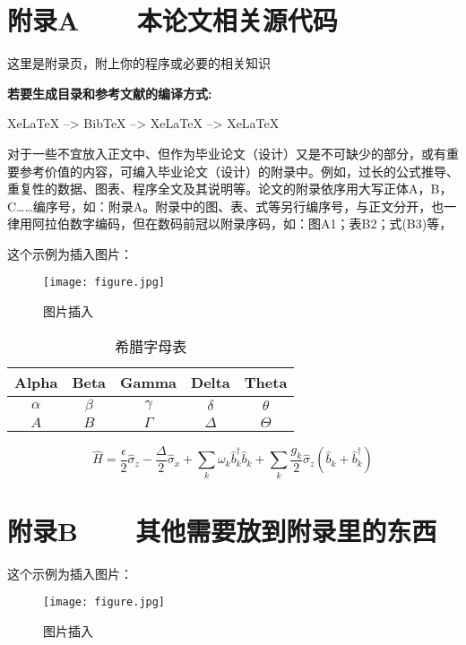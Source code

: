 \chapter*{附录A~~~~本论文相关源代码}
这里是附录页，附上你的程序或必要的相关知识

\bf\heiti\color{red}若要生成目录和参考文献的编译方式:

\color{black}XeLaTeX --> BibTeX --> XeLaTeX --> XeLaTeX

\fangsong
对于一些不宜放入正文中、但作为毕业论文（设计）又是不可缺少的部分，或有重要参考价值的内容，可编入毕业论文（设计）的附录中。例如，过长的公式推导、重复性的数据、图表、程序全文及其说明等。论文的附录依序用大写正体A，B，C……编序号，如：附录A。附录中的图、表、式等另行编序号，与正文分开，也一律用阿拉伯数字编码，但在数码前冠以附录序码，如：图A1；表B2；式(B3)等，

这个示例为插入图片：
\begin{figure}[H]
	\centering
	\texttt{[image: figure.jpg]}%
	\caption{图片插入\label{fig:appA}}
\end{figure}

\begin{table}[H]
	\begin{center}
		\caption{希腊字母表\label{tab:appA}}
		\begin{tabular}{|c|c|c|c|c|}
			\hline
			Alpha & Beta & Gamma & Delta & Theta\\
			\hline
			$\alpha$ & $\beta$ & $\gamma$ & $\delta$ & $\theta$\\
			\hline
			$A$ & $B$ & $\Gamma$ & $\Delta$ & $\Theta$\\
			\hline
		\end{tabular}
	\end{center}
\end{table}

\begin{equation}
	\hat{H}=\frac{\epsilon}{2}\hat{\sigma}_{z}-\frac{\Delta}{2}\hat{\sigma}_{x}+\sum_{k}\omega_{k}\hat{b}_{k}^{\dagger}\hat{b}_{k}+\sum_{k}\frac{g_{k}}{2}\hat{\sigma}_{z}(\hat{b}_{k}+\hat{b}_{k}^{\dagger})\label{eq:appA}
\end{equation}

\chapter*{附录B~~~~其他需要放到附录里的东西}
这个示例为插入图片：
\begin{figure}[H]
	\centering
	\texttt{[image: figure.jpg]}%
	\caption{图片插入\label{fig:appB}}
\end{figure}

